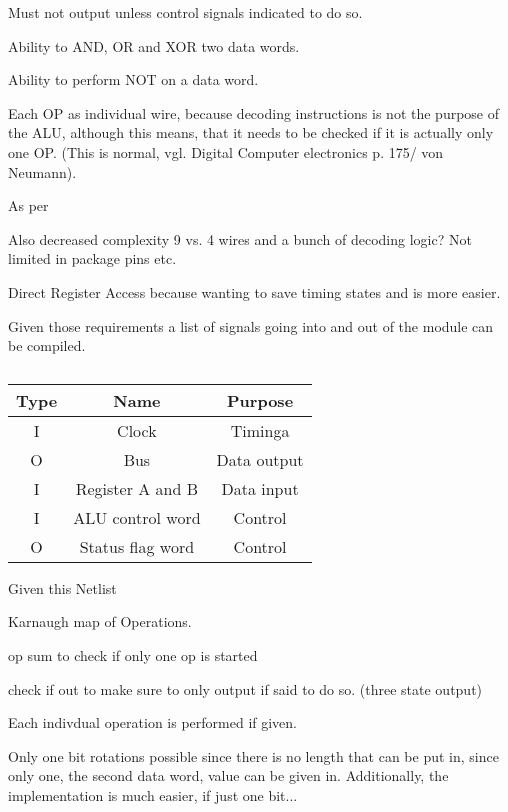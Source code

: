 \begin{feat-requirement}
  Must not output unless control signals indicated to do so. 
\end{feat-requirement}

\begin{feat-requirement}
  Ability to AND, OR and XOR two data words.
\end{feat-requirement}

\begin{feat-requirement}
  Ability to perform NOT on a data word.
\end{feat-requirement}

Each OP as individual wire, because decoding instructions is not the purpose of the ALU, although this means, that it needs to be checked if it is actually only one OP. (This is normal, vgl. Digital Computer electronics p. 175/ von Neumann). 

As per \cite{vonneuman1945a}


Also decreased complexity 9 vs. 4 wires and a bunch of decoding logic? Not limited in package pins etc. 

Direct Register Access because wanting to save timing states and is more easier. 

Given those requirements a list of signals going into and out of the module can be compiled. 

\begin{table}[]
\begin{tabular}{ccc}
Type& Name & Purpose \\ \hline
I   & Clock & Timinga \\
O   & Bus     & Data output         \\
I   & Register A and B & Data input \\
I   & ALU control word & Control \\
O   & Status flag word & Control
\end{tabular}
\caption{}
\label{tab:alu-i/o}
\end{table}

Given this Netlist

Karnaugh map of Operations. 




op sum to check if only one op is started

check if out to make sure to only output if said to do so. (three state output)

Each indivdual operation is performed if given.

Only one bit rotations possible since there is no length that can be put in, since only one, the second data word, value can be given in. Additionally, the implementation is much easier, if just one bit...
